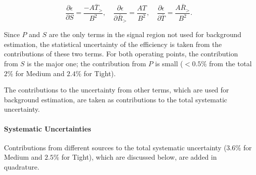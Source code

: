 $$\frac{\partial \epsilon}{\partial S} = \frac{- A \overline{T}_> }{B^2},
	\quad
	\frac{\partial \epsilon}{\partial \overline{R}_>} = \frac{AT }{B^2},
	\quad
	\frac{\partial \epsilon}{\partial \overline{T}} = \frac{A \overline{R}_> }{B^2}.
$$

Since $P$ and $S$ are the only terms in the signal region not used for
background estimation, the statistical uncertainty of the efficiency is taken
from the contributions of these two terms. For both operating points, the
contribution from $S$ is the major one; the contribution from $P$ is small ($<
	0.5\%$ from the total $2\%$ for Medium and $2.4\%$ for Tight).

The contributions to the uncertainty from other terms, which are used for
background estimation, are taken as contributions to the total systematic
uncertainty.


\paragraph{Systematic Uncertainties} Contributions from different sources to
the total systematic uncertainty ($3.6\%$ for Medium and $2.5\%$ for Tight),
which are discussed below, are added in quadrature.

